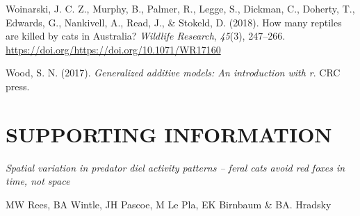 \documentclass[]{elsarticle} %
\begin{document}
\leavevmode\hypertarget{ref-woinarski2018reptiles}{}%
Woinarski, J. C. Z., Murphy, B., Palmer, R., Legge, S., Dickman, C., Doherty, T., Edwards, G., Nankivell, A., Read, J., \& Stokeld, D. (2018). How many reptiles are killed by cats in Australia? \emph{Wildlife Research}, \emph{45}(3), 247--266. \url{https://doi.org/https://doi.org/10.1071/WR17160}

\leavevmode\hypertarget{ref-wood2017generalized}{}%
Wood, S. N. (2017). \emph{Generalized additive models: An introduction with r}. CRC press.

\newpage
\setcounter{table}{0}  \renewcommand{\thetable}{S\arabic{table}} \setcounter{figure}{0} \renewcommand{\thefigure}{S\arabic{figure}} \setcounter{section}{0} \renewcommand{\thesection}{S\arabic{section}}
\setcounter{page}{1}
\nolinenumbers

\hypertarget{supporting-information}{%
\section*{SUPPORTING INFORMATION}\label{supporting-information}}

\emph{Spatial variation in predator diel activity patterns -- feral cats avoid red foxes in time, not space}

MW Rees, BA Wintle, JH Pascoe, M Le Pla, EK Birnbaum \& BA. Hradsky

\newpage

\(~\)

\(~\)

\(~\)

\begingroup\fontsize{10}{12}\selectfont
\end{document}
